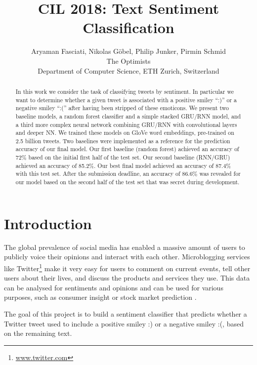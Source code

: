 \documentclass[10pt,conference,compsocconf]{IEEEtran}
\begin{document}
\title{CIL 2018: Text Sentiment Classification}

\author{
  Aryaman Fasciati, Nikolas G\"obel, Philip Junker, Pirmin Schmid\\
  The Optimists\\
  Department of Computer Science, ETH Zurich, Switzerland
}

\maketitle

\begin{abstract}
  In this work we consider the task of classifying tweets by
  sentiment. In particular we want to determine whether a given tweet
  is associated with a positive smiley ``:)'' or a negative smiley ``:(''
  after having been stripped of these emoticons. We present two baseline models,
  a random forest classifier and a simple stacked GRU/RNN model, and a
  third more complex neural network combining GRU/RNN with convolutional
  layers and deeper NN. We trained these models on GloVe word embeddings, pre-trained
  on 2.5 billion tweets. 
  Two baselines were implemented as a reference for the prediction accuracy of our final model. 
  Our first baseline (random forest) achieved an accuracy of 72\% based on the initial first half of the test set. 
  Our second baseline (RNN/GRU) achieved an accuracy of 85.2\%.
  Our best final model achieved an accuracy of 87.4\% with this test set. After the submission deadline, an accuracy of 
  86.6\% was revealed for our model based on the second half of the test set
  that was secret during development.
\end{abstract}

\section{Introduction}

The global prevalence of social media has enabled a massive amount of users
to publicly voice their opinions and interact with each other.
Microblogging services like Twitter\footnote{\url{www.twitter.com}} make it
very easy for users to comment on current events, tell other users about their
lives, and discuss the products and services they use.
This data can be analysed for sentiments and opinions and can be used for
various purposes, such as consumer insight \cite{Chamlertwat2012}
or stock market prediction \cite{Rao:2012}.

The goal of this project is to build a sentiment classifier that
predicts whether a Twitter tweet used to include a positive smiley :) or
a negative smiley :(, based on the remaining text.
\end{document}
